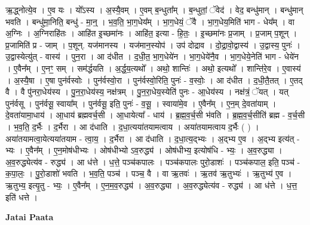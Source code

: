 \documentclass[17pt]{extarticle}
\begin{document}
ऋ॒द्ध्नोत्ये॒व । ए॒व यः । यो᳚ऽस्य । अ॒स्यै॒वम् । ए॒वम् ब॒न्धुता᳚म् । ब॒न्धुतां॒ ॅवेद॑ । वेद॒ बन्धु॑मान् । बन्धु॑मान् भवति । बन्धु॑मा॒निति॒ बन्धु॑ - मा॒न्॒ । भ॒व॒ति॒ भा॒ग॒धेय᳚म् । भा॒ग॒धेयं॒ ॅवै । भा॒ग॒धेय॒मिति॑ भाग - धेय᳚म् । वा अ॒ग्निः । अ॒ग्निराहि॑तः । आहि॑त इ॒च्छमा॑नः । आहि॑त॒ इत्या - हि॒तः॒ । इ॒च्छमा॑नः प्र॒जाम् । प्र॒जाम् प॒शून् । प्र॒जामिति॑ प्र - जाम् । प॒शून्. यज॑मानस्य । यज॑मान॒स्योप॑ । उप॑ दोद्राव । दो॒द्रा॒वो॒द्वास्य॑ । उ॒द्वास्य॒ पुनः॑ । उ॒द्वास्येत्यु॑त् - वास्य॑ । पुन॒रा । आ द॑धीत । द॒धी॒त॒ भा॒ग॒धेये॑न । भा॒ग॒धेये॑नै॒व । भा॒ग॒धेये॒नेति॑ भाग - धेये॑न । ए॒वैन᳚म् । ए॒नꣳ॒॒ सम् । सम॑र्द्धयति । अ॒र्द्ध॒य॒त्यथो᳚ । अथो॒ शान्तिः॑ । अथो॒ इत्यथो᳚ । शान्ति॑रे॒व । ए॒वास्य॑ । अ॒स्यै॒षा । ए॒षा पुन॑र्वस्वोः । पुन॑र्वस्वो॒रा । पुन॑र्वस्वो॒रिति॒ पुनः॑ - व॒स्वोः॒ । आ द॑धीत । द॒धी॒तै॒तत् । ए॒तद् वै । वै पु॑नरा॒धेय॑स्य । पु॒न॒रा॒धेय॑स्य॒ नक्ष॑त्रम् । पु॒न॒रा॒धेय॒स्येति॑ पुनः - आ॒धेय॑स्य । नक्ष॑त्रं॒ ॅयत् । यत् पुन॑र्वसू । पुन॑र्वसू॒ स्वाया᳚म् । पुन॑र्वसू॒ इति॒ पुनः॑ - व॒सू॒ । स्वाया॑मे॒व । ए॒वैन᳚म् । ए॒न॒म् दे॒वता॑याम् । दे॒वता॑यामा॒धाय॑ । आ॒धाय॑ ब्रह्मवर्च॒सी । आ॒धायेत्या᳚ - धाय॑ । ब्र॒ह्म॒व॒र्च॒सी भ॑वति । ब्र॒ह्म॒व॒र्च॒सीति॑ ब्रह्म - व॒र्च॒सी । भ॒व॒ति॒ द॒र्भैः । द॒र्भैरा । आ द॑धाति । द॒धा॒त्यया॑तयामत्वाय । अया॑तयामत्वाय द॒र्भैः ( ) । अया॑तयामत्वा॒येत्यया॑तयाम - त्वा॒य॒ । द॒र्भैरा । आ द॑धाति । द॒धा॒त्य॒द्भ्यः । अ॒द्भ्य ए॒व । अ॒द्भ्य इत्य॑त् - भ्यः । ए॒वैन᳚म् । ए॒न॒मोष॑धीभ्यः । ओष॑धीभ्यो ऽव॒रुद्ध्य॑ । ओष॑धीभ्य॒ इत्योष॑धि - भ्यः॒ । अ॒व॒रुद्ध्या । अ॒व॒रुद्ध्येत्य॑व - रुद्ध्य॑ । आ ध॑त्ते । ध॒त्ते॒ पञ्च॑कपालः । पञ्च॑कपालः पुरो॒डाशः॑ । पञ्च॑कपाल॒ इति॒ पञ्च॑ - क॒पा॒लः॒ । पु॒रो॒डाशो॑ भवति । भ॒व॒ति॒ पञ्च॑ । पञ्च॒ वै । वा ऋ॒तवः॑ । ऋ॒तव॑ ऋ॒तुभ्यः॑ । ऋ॒तुभ्य॑ ए॒व । ऋ॒तुभ्य॒ इत्यृ॒तु - भ्यः॒ । ए॒वैन᳚म् । ए॒न॒म॒व॒रुद्ध्य॑ । अ॒व॒रुद्ध्या । अ॒व॒रुद्ध्येत्य॑व - रुद्ध्य॑ । आ ध॑त्ते । ध॒त्त॒ इति॑ धत्ते । \newline

\textbf{Jatai Paata} \newline
\end{document}
